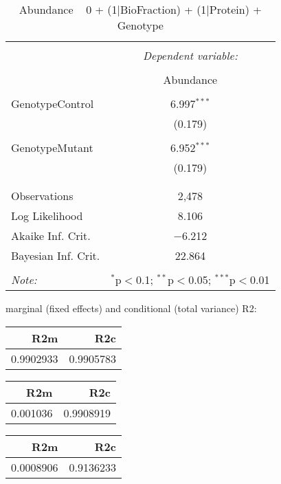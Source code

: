 \documentclass[11pt]{report}
\begin{document}
\begin{table}[!htbp] \centering 
  \caption{Abundance ~ 0 + (1|BioFraction) + (1|Protein) + Genotype} 
  \label{} 
\begin{tabular}{@{\extracolsep{5pt}}lc} 
\\[-1.8ex]\hline 
\hline \\[-1.8ex] 
 & \multicolumn{1}{c}{\textit{Dependent variable:}} \\ 
\cline{2-2} 
\\[-1.8ex] & Abundance \\ 
\hline \\[-1.8ex] 
 GenotypeControl & 6.997$^{***}$ \\ 
  & (0.179) \\ 
  & \\ 
 GenotypeMutant & 6.952$^{***}$ \\ 
  & (0.179) \\ 
  & \\ 
\hline \\[-1.8ex] 
Observations & 2,478 \\ 
Log Likelihood & 8.106 \\ 
Akaike Inf. Crit. & $-$6.212 \\ 
Bayesian Inf. Crit. & 22.864 \\ 
\hline 
\hline \\[-1.8ex] 
\textit{Note:}  & \multicolumn{1}{r}{$^{*}$p$<$0.1; $^{**}$p$<$0.05; $^{***}$p$<$0.01} \\ 
\end{tabular} 
\end{table} 
marginal (fixed effects) and conditional (total variance) R2:

\begin{tabular}{r|r}
\hline
R2m & R2c\\
\hline
0.9902933 & 0.9905783\\
\hline
\end{tabular}

\begin{tabular}{r|r}
\hline
R2m & R2c\\
\hline
0.001036 & 0.9908919\\
\hline
\end{tabular}

\begin{tabular}{r|r}
\hline
R2m & R2c\\
\hline
0.0008906 & 0.9136233\\
\hline
\end{tabular}
\end{document}
